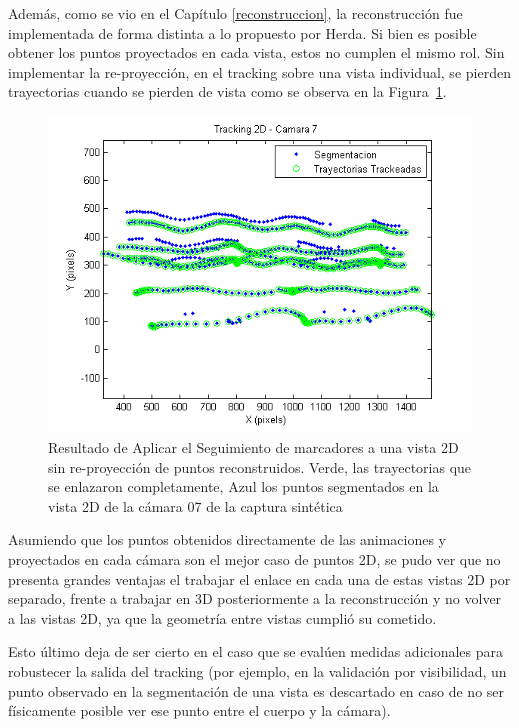 Además, como se vio en el Capítulo \ref{reconstruccion}, la reconstrucción fue implementada de forma distinta a lo propuesto por Herda. Si bien es posible obtener los puntos proyectados en cada vista, estos no cumplen el mismo rol. Sin implementar la re-proyección, en el tracking sobre una vista individual, se pierden trayectorias cuando se pierden de vista como se observa en la Figura~\ref{tracking_2D_cam_07}.
\vspace{-0.2cm}
\begin{figure}[ht!]
\begin{center}
\includegraphics[scale=0.7]{img/Tracking/011_tracking_2D_camara_07.png}
\end{center}
\vspace{-0.8cm}
\caption{Resultado de Aplicar el Seguimiento de marcadores a una vista 2D sin re-proyección de puntos reconstruidos. Verde, las trayectorias que se enlazaron completamente, Azul los puntos segmentados en la vista 2D de la cámara 07 de la captura sintética}
\label{tracking_2D_cam_07}
\end{figure}

Asumiendo que los puntos obtenidos directamente de las animaciones y proyectados en cada cámara son el mejor caso de puntos 2D, se pudo ver que no presenta grandes ventajas el trabajar el enlace en cada una de estas vistas 2D por separado, frente a trabajar en 3D posteriormente a la reconstrucción y no volver a las vistas 2D, ya que la geometría entre vistas cumplió su cometido. 


Esto último deja de ser cierto en el caso que se evalúen medidas adicionales para robustecer la salida del tracking (por ejemplo, en la validación por visibilidad, un punto observado en la segmentación de una vista es descartado en caso de no ser físicamente posible ver ese punto entre el cuerpo y la cámara).

